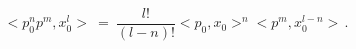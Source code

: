 \begin{equation}< p_0^n p^m , x_0^l> \ = \
\frac{l!}{(l-n)!} <p_0 , x_0 >^n < p^m , x_0^{l-n} >\,
.\end{equation} 
